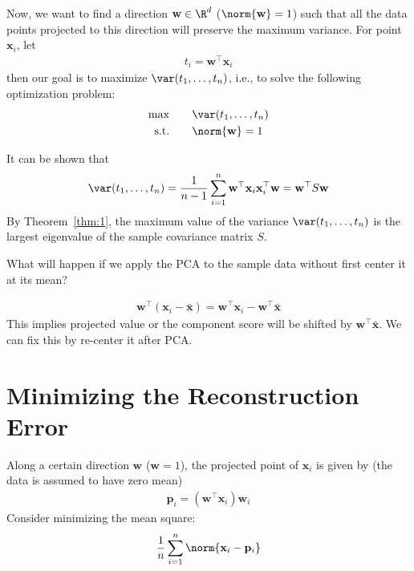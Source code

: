 \documentclass[color=blue, thmcnt=section, 12pt]{elegantbook}
\begin{document}
\par Now, we want to find a direction $\mathbf{w} \in \R^d$ ($\norm{\mathbf{w}} = 1$) such that all the data points projected to this direction will preserve the maximum variance. For point $\mathbf{x}_i$, let 
\begin{align*}
    t_i = \mathbf{w}^\top \mathbf{x}_i
\end{align*}
then our goal is to maximize $\var(t_1, \ldots, t_n)$, i.e., to solve the following optimization problem:
\begin{alignat*}{2}
    \max&\quad & &\var(t_1, \ldots, t_n) \\ 
    \text{s.t.}& & &\norm{\mathbf{w}} = 1
\end{alignat*}

\par It can be shown that 
\begin{align*}
    \var(t_1, \ldots, t_n)
    = \frac{1}{n-1} \sum_{i=1}^n \mathbf{w}^\top \mathbf{x}_i \mathbf{x}_i^\top \mathbf{w}
    = \mathbf{w}^\top S \mathbf{w}
\end{align*}
By Theorem~\ref{thm:1}, the maximum value of the variance $\var(t_1, \ldots, t_n)$ is the largest eigenvalue of the sample covariance matrix $S$.

\par What will happen if we apply the PCA to the sample data without first center it at its mean?

\begin{align*}
    \mathbf{w}^\top (\mathbf{x}_i - \bar{\mathbf{x}})
    = \mathbf{w}^\top \mathbf{x}_i 
    - \mathbf{w}^\top \bar{\mathbf{x}}
\end{align*}
This implies projected value or the component score will be shifted by $\mathbf{w}^\top \bar{\mathbf{x}}$. We can fix this by re-center it after PCA.


\section{Minimizing the Reconstruction Error}


\par Along a certain direction $\mathbf{w}$ ($\mathbf{w} = 1$), the projected point of $\mathbf{x}_i$ is given by (the data is assumed to have zero mean)
\begin{align*}
    \mathbf{p}_i = (\mathbf{w}^\top \mathbf{x}_i) \mathbf{w}_i
\end{align*}
Consider minimizing the mean square:
\begin{align}
    \frac{1}{n} \sum_{i=1}^n \norm{\mathbf{x}_i - \mathbf{p}_i}
    \label{eq:1}
\end{align}
\end{document}
